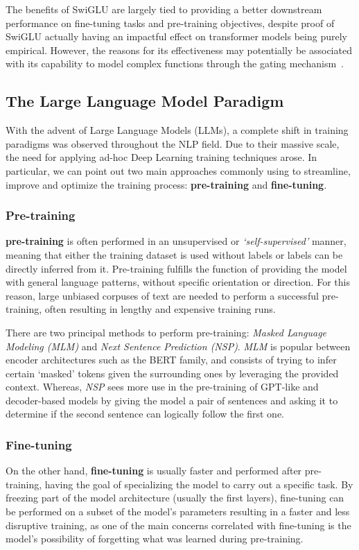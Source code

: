 The benefits of SwiGLU are largely tied to providing a better downstream performance on fine-tuning tasks and pre-training objectives, despite proof of SwiGLU actually having an impactful effect on transformer models being purely empirical.
However, the reasons for its effectiveness may potentially be associated with its capability to model complex functions through the gating mechanism~\cite{shazeer2020,shibuya2023}.

\subsection{The Large Language Model Paradigm}

With the advent of Large Language Models (LLMs), a complete shift in training paradigms was observed throughout the NLP field.
Due to their massive scale, the need for applying ad-hoc Deep Learning training techniques arose.
In particular, we can point out two main approaches commonly using to streamline, improve and optimize the training process: \textbf{pre-training} and \textbf{fine-tuning}.

\subsubsection*{Pre-training}

\textbf{pre-training} is often performed in an unsupervised or \emph{`self-supervised'} manner, meaning that either the training dataset is used without labels or labels can be directly inferred from it.
Pre-training fulfills the function of providing the model with general language patterns, without specific orientation or direction.
For this reason, large unbiased corpuses of text are needed to perform a successful pre-training, often resulting in lengthy and expensive training runs.

There are two principal methods to perform pre-training: \emph{Masked Language Modeling (MLM)} and \emph{Next Sentence Prediction (NSP)}.
\emph{MLM} is popular between encoder architectures such as the BERT family, and consists of trying to infer certain `masked' tokens given the surrounding ones by leveraging the provided context.
Whereas, \emph{NSP} sees more use in the pre-training of GPT-like and decoder-based models by giving the model a pair of sentences and asking it to determine if the second sentence can logically follow the first one.

\subsubsection*{Fine-tuning}

On the other hand, \textbf{fine-tuning} is usually faster and performed after pre-training, having the goal of specializing the model to carry out a specific task.
By freezing part of the model architecture (usually the first layers), fine-tuning can be performed on a subset of the model's parameters resulting in a faster and less disruptive training, as one of the main concerns correlated with fine-tuning is the model's possibility of forgetting what was learned during pre-training.